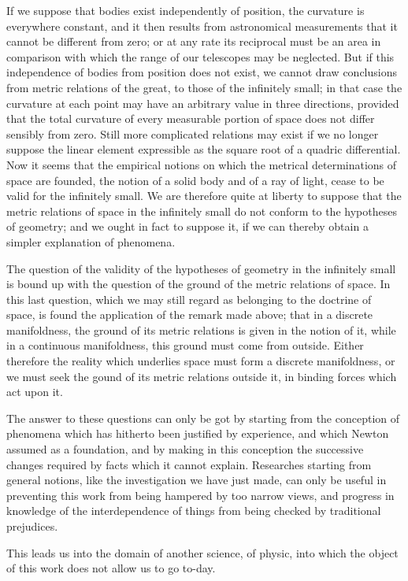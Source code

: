 \documentclass[a4paper,12pt]{article}
\begin{document}
If we suppose that bodies exist independently of position, the
curvature is everywhere constant, and it then results from
astronomical measurements that it cannot be different from zero;
or at any rate its reciprocal must be an area in comparison with
which the range of our telescopes may be neglected.  But if this
independence of bodies from position does not exist, we cannot
draw conclusions from metric relations of the great, to those of
the infinitely small; in that case the curvature at each point
may have an arbitrary value in three directions, provided that
the total curvature of every measurable portion of space does not
differ sensibly from zero.  Still more complicated relations may
exist if we no longer suppose the linear element expressible as
the square root of a quadric differential.  Now it seems that the
empirical notions on which the metrical determinations of space
are founded, the notion of a solid body and of a ray of light,
cease to be valid for the infinitely small.  We are therefore
quite at liberty to suppose that the metric relations of space in
the infinitely small do not conform to the hypotheses of
geometry; and we ought in fact to suppose it, if we can thereby
obtain a simpler explanation of phenomena.

The question of the validity of the hypotheses of geometry in the
infinitely small is bound up with the question of the ground of
the metric relations of space.  In this last question, which we
may still regard as belonging to the doctrine of space, is found
the application of the remark made above; that in a discrete
manifoldness, the ground of its metric relations is given in the
notion of it, while in a continuous manifoldness, this ground
must come from outside.  Either therefore the reality which
underlies space must form a discrete manifoldness, or we must
seek the gound of its metric relations outside it, in binding
forces which act upon it.

The answer to these questions can only be got by starting from
the conception of phenomena which has hitherto been justified by
experience, and which Newton assumed as a foundation, and by
making in this conception the successive changes required by
facts which it cannot explain.  Researches starting from general
notions, like the investigation we have just made, can only be
useful in preventing this work from being hampered by too narrow
views, and progress in knowledge of the interdependence of things
from being checked by traditional prejudices.

This leads us into the domain of another science, of physic, into
which the object of this work does not allow us to go to-day.
\end{document}
